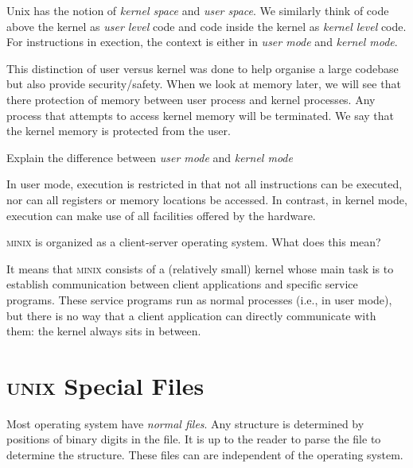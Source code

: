 Unix has the notion of \textit{kernel space} and \textit{user space}. 
We similarly think of code above the kernel as \textit{user level} code and 
code inside the kernel as \textit{kernel level} code.
For instructions in exection, the context is either in 
\textit{user mode} and \textit{kernel mode}.

This distinction of user versus kernel
 was done to help organise a large codebase but also provide security/safety.
When we look at memory later, we will see that there protection of 
memory between user process and kernel processes. Any process that attempts to access 
kernel memory will be terminated. We say that the kernel memory is protected from the user. 

\begin{example}
Explain the difference between \textit{user mode} and \textit{kernel mode}

In user mode, execution is restricted in that not all instructions can be executed, nor can all registers or memory locations be accessed. In contrast, in kernel mode, execution can make use of all facilities offered by the hardware.
\end{example}


\begin{example}
\textsc{minix} is organized as a client-server operating system. What does this mean?

It means that \textsc{minix} consists of a (relatively small) kernel whose main task is to establish communication between client applications and speciﬁc service programs. These service programs run
as normal processes (i.e., in user mode), but there is no way that a client application can directly
communicate with them: the kernel always sits in between.
\end{example}



\section{\textsc{unix} Special Files}


Most operating system have \textit{normal files}.
Any structure is determined by positions of 
binary digits in the file. It is up to the reader to 
parse the file to determine the structure. These files 
can are independent of the operating system. 

